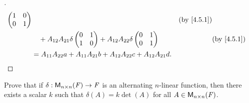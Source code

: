 \begin{proof}[]
\begin{align*}
\begin{pmatrix}
			                                                                                      1 & 0 \\
			                                                                                      0 & 1
		                                                                                      \end{pmatrix}                            &  & \by{4.5.1}       \\
		                      & \quad + A_{1 2} A_{2 1} \delta\begin{pmatrix}
			                                                      0 & 1 \\
			                                                      1 & 0
		                                                      \end{pmatrix} + A_{1 2} A_{2 2} \delta\begin{pmatrix}
			                                                                                            0 & 1 \\
			                                                                                            0 & 1
		                                                                                            \end{pmatrix}                            &  & \by{4.5.1} \\
		                      & = A_{1 1} A_{2 2} a + A_{1 1} A_{2 1} b + A_{1 2} A_{2 2} c + A_{1 2} A_{2 1} d.
	\end{align*}
\end{proof}

\begin{ex}\label{ex:4.5.16}
	Prove that if \(\delta : \ms[n][n][\F] \to \F\) is an alternating \(n\)-linear function, then there exists a scalar \(k\) such that \(\delta(A) = k \det(A)\) for all \(A \in \ms[n][n][\F]\).
\end{ex}

